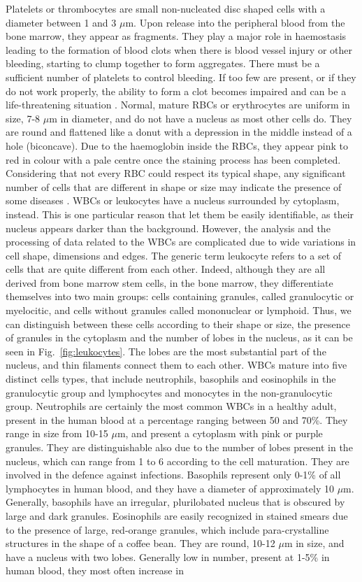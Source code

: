 \documentclass[final,a4paper,12pt,english]{UnicaPhdThesis3}
\begin{document}
Platelets or thrombocytes are small non-nucleated disc shaped cells with a diameter between 1 and 3 $\mu$m. Upon release into the peripheral blood from the bone marrow, they appear as fragments. They play a major role in haemostasis leading to the formation of blood clots when there is blood vessel injury or other bleeding, starting to clump together to form aggregates. There must be a sufficient number of platelets to control bleeding. If too few are present, or if they do not work properly, the ability to form a clot becomes impaired and can be a life-threatening situation \cite{Ciesla}. Normal, mature RBCs or erythrocytes are uniform in size, 7-8 $\mu$m in diameter,  and do not have a nucleus as most other cells do. They are round and flattened like a donut with a depression in the middle instead of a hole (biconcave). Due to the haemoglobin inside the RBCs, they appear pink to red in colour with a pale centre once the staining process has been completed. Considering that not every RBC could respect its typical shape, any significant number of cells that are different in shape or size may indicate the presence of some diseases \cite{Erhabor}. WBCs or leukocytes have a nucleus surrounded by cytoplasm, instead. This is one particular reason that let them be easily identifiable, as their nucleus appears darker than the background. However, the analysis and the processing of data related to the WBCs are complicated due to wide variations in cell shape, dimensions and edges. The generic term leukocyte refers to a set of cells that are quite different from each other. Indeed, although they are all derived from bone marrow stem cells, in the bone marrow, they differentiate themselves into two main groups: cells containing granules, called granulocytic or myelocitic, and cells without granules called mononuclear or lymphoid. Thus, we can distinguish between these cells according to their shape or size, the presence of granules in the cytoplasm and the number of lobes in the nucleus, as it can be seen in Fig.~\ref{fig:leukocytes}. The lobes are the most substantial part of the nucleus, and thin filaments connect them to each other. WBCs mature into five distinct cells types, that include neutrophils, basophils and eosinophils in the granulocytic group and lymphocytes and monocytes in the non-granulocytic group. Neutrophils are certainly the most common WBCs in a healthy adult, present in the human blood at a percentage ranging between 50 and 70\%. They range in size from 10-15 $\mu$m, and present a cytoplasm with pink or purple granules. They are distinguishable also due to the number of lobes present in the nucleus, which can range from 1 to 6 according to the cell maturation. They are involved in the defence against infections. Basophils represent only 0-1\% of all lymphocytes in human blood, and they have a diameter of approximately 10 $\mu$m. Generally, basophils have an irregular, plurilobated nucleus that is obscured by large and dark granules. Eosinophils are easily recognized in stained smears due to the presence of large, red-orange granules, which include para-crystalline structures in the shape of a coffee bean. They are round, 10-12 $\mu$m in size, and have a nucleus with two lobes. Generally low in number, present at 1-5\% in human blood, they most often increase in 
\end{document}
